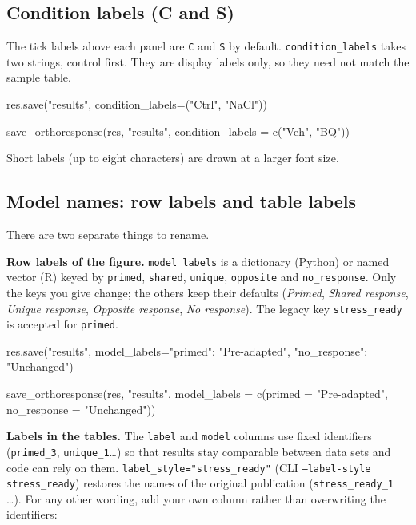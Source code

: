 \documentclass[11pt,a4paper]{article}
\newcommand{\code}[1]{\texttt{\color{navy!85!black}#1}}
\begin{document}
\subsection{Condition labels (C and S)}

The tick labels above each panel are \code{C} and \code{S} by default. \code{condition\_labels} takes
two strings, control first. They are display labels only, so they need not match the sample table.

\begin{pycode}
res.save("results", condition_labels=("Ctrl", "NaCl"))
\end{pycode}
\begin{rcode}
save_orthoresponse(res, "results", condition_labels = c("Veh", "BQ"))
\end{rcode}

Short labels (up to eight characters) are drawn at a larger font size.

\subsection{Model names: row labels and table labels}

There are two separate things to rename.

\textbf{Row labels of the figure.} \code{model\_labels} is a dictionary (Python) or named vector (R)
keyed by \code{primed}, \code{shared}, \code{unique}, \code{opposite} and \code{no\_response}. Only the
keys you give change; the others keep their defaults (\emph{Primed}, \emph{Shared response},
\emph{Unique response}, \emph{Opposite response}, \emph{No response}). The legacy key
\code{stress\_ready} is accepted for \code{primed}.

\begin{pycode}
res.save("results", model_labels={"primed": "Pre-adapted", "no_response": "Unchanged"})
\end{pycode}
\begin{rcode}
save_orthoresponse(res, "results",
                   model_labels = c(primed = "Pre-adapted", no_response = "Unchanged"))
\end{rcode}

\textbf{Labels in the tables.} The \code{label} and \code{model} columns use fixed identifiers
(\code{primed\_3}, \code{unique\_1}\ldots) so that results stay comparable between data sets and
code can rely on them. \code{label\_style="stress\_ready"} (CLI \code{--label-style stress\_ready})
restores the names of the original publication (\code{stress\_ready\_1} \ldots). For any other
wording, add your own column rather than overwriting the identifiers:
\end{document}

